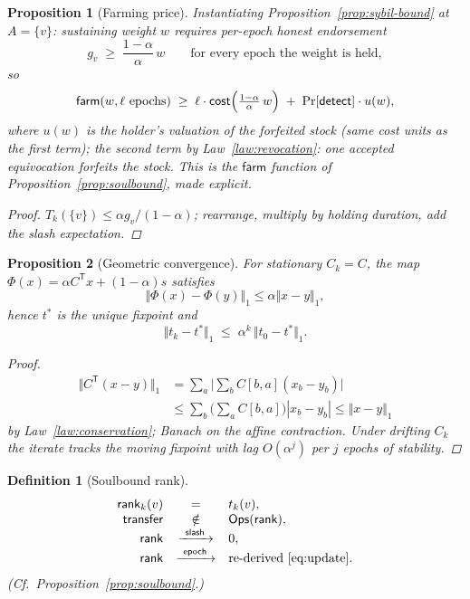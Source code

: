 \documentclass[11pt,letterpaper]{article}
\newtheorem{definition}{Definition}
\newtheorem{proposition}{Proposition}
\begin{document}
\begin{proposition}[Farming price]\label{prop:farm-price}
Instantiating Proposition~\ref{prop:sybil-bound} at $A=\{v\}$:
sustaining weight $w$ requires per-epoch honest endorsement
\[
g_v\;\geq\;\frac{1-\alpha}{\alpha}\,w
\qquad\text{for every epoch the weight is held},
\]
so
\[
\mathsf{farm}(w,\ell\ \text{epochs})
\;\geq\;
\ell\cdot\mathsf{cost}\Bigl(\tfrac{1-\alpha}{\alpha}\,w\Bigr)
\;+\;
\Pr[\mathsf{detect}]\cdot u(w),
\]
where $u(w)$ is the holder's valuation of the forfeited stock (same
cost units as the first term); the second term by
Law~\ref{law:revocation}: one accepted equivocation forfeits the stock.  This is the $\mathsf{farm}$ function of
Proposition~\ref{prop:soulbound}, made explicit.
\begin{proof}
$T_k(\{v\})\leq\alpha g_v/(1-\alpha)$; rearrange, multiply by holding
duration, add the slash expectation.
\end{proof}
\end{proposition}

\begin{proposition}[Geometric convergence]\label{prop:convergence}
For stationary $C_k=C$, the map
$\Phi(x)=\alpha C^{\mathsf T}x+(1-\alpha)s$ satisfies
\[
\Vert\Phi(x)-\Phi(y)\Vert_1\leq\alpha\Vert x-y\Vert_1,
\]
hence $t^{*}$ is the unique fixpoint and
\[
\Vert t_k-t^{*}\Vert_1\;\leq\;\alpha^{k}\,\Vert t_0-t^{*}\Vert_1 .
\]
\begin{proof}
\[
\begin{aligned}
\Vert C^{\mathsf T}(x-y)\Vert_1
&=\textstyle\sum_a\bigl|\sum_b C[b,a](x_b-y_b)\bigr|\\
&\leq\textstyle\sum_b\bigl(\sum_a C[b,a]\bigr)|x_b-y_b|
\leq\Vert x-y\Vert_1
\end{aligned}
\]
by Law~\ref{law:conservation}; Banach on the affine contraction.
Under drifting $C_k$ the iterate tracks the moving fixpoint with lag
$O(\alpha^{j})$ per $j$ epochs of stability.
\end{proof}
\end{proposition}

\begin{definition}[Soulbound rank]\label{def:soulbound}
\[
\begin{array}{rcl}
\mathsf{rank}_k(v)&=&t_k(v),\\
\mathsf{transfer}&\notin&\mathsf{Ops}(\mathsf{rank}),\\
\mathsf{rank}&\xrightarrow{\ \mathsf{slash}\ }&0,\\
\mathsf{rank}&\xrightarrow{\ \mathsf{epoch}\ }&
  \text{re-derived}\ \eqref{eq:update}.
\end{array}
\]
(Cf.\ Proposition~\ref{prop:soulbound}.)
\end{definition}
\end{document}
